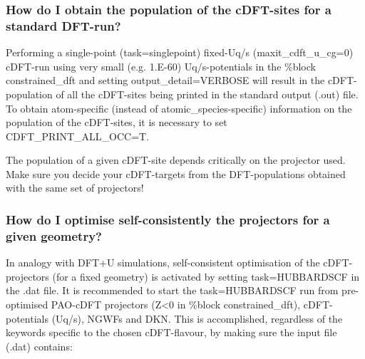 \documentclass[letterpaper,10pt,english]{sphinxmanual}
\begin{document}
\subsubsection{How do I obtain the population of the cDFT-sites for a standard DFT-run?}
\label{\detokenize{cDFT:how-do-i-obtain-the-population-of-the-cdft-sites-for-a-standard-dft-run}}
Performing a single-point (task=singlepoint) fixed-Uq/s
(maxit\_cdft\_u\_cg=0) cDFT-run using very small (e.g. 1.E-60)
Uq/s-potentials in the \%block constrained\_dft and setting
output\_detail=VERBOSE will result in the cDFT-population of all the
cDFT-sites being printed in the standard output (.out) file. To obtain
atom-specific (instead of atomic\_species-specific) information on the
population of the cDFT-sites, it is necessary to set
CDFT\_PRINT\_ALL\_OCC=T.

 The population of a given cDFT-site depends critically on the
projector used. Make sure you decide your cDFT-targets from the
DFT-populations obtained with the same set of projectors!


\subsubsection{How do I optimise self-consistently the projectors for a given geometry?}
\label{\detokenize{cDFT:how-do-i-optimise-self-consistently-the-projectors-for-a-given-geometry}}
In analogy with DFT+U simulations, self-consistent optimisation of the
cDFT-projectors (for a fixed geometry) is activated by setting
task=HUBBARDSCF in the .dat file. It is recommended to start the
task=HUBBARDSCF run from pre-optimised PAO-cDFT projectors (Z\textless{}0 in
\%block constrained\_dft), cDFT-potentials (Uq/s), NGWFs and DKN. This is
accomplished, regardless of the keywords specific to the chosen
cDFT-flavour, by making sure the input file (.dat) contains:

%
\begin{sphinxVerbatim}[commandchars=\\\{\}]
  
   
  
  
  
  
\end{sphinxVerbatim}
\end{document}
